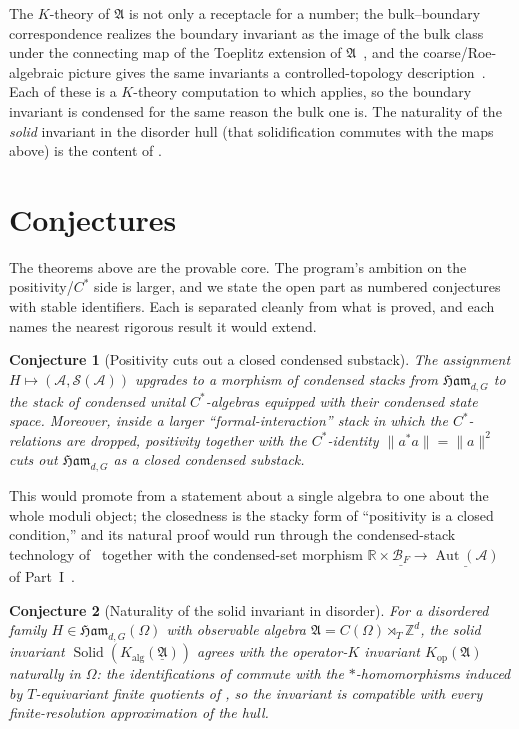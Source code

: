 \documentclass[12pt]{article}
\newcommand{\cond}[1]{\underline{#1}}          %
\newcommand{\BF}{\mathcal{B}_{F}}              %
\newcommand{\Ham}{\mathfrak{Ham}}              %
\newcommand{\Kop}{K_{\mathrm{op}}}             %
\newcommand{\Kalg}{K_{\mathrm{alg}}}           %
\newcommand{\Solid}{\operatorname{Solid}}      %
\newcommand{\dis}{\Omega}                       %
\newcommand{\qla}{\mathcal{A}}                  %
\newcommand{\St}{\mathcal{S}}                   %
\newcommand{\Aut}{\operatorname{Aut}}          %
\newcommand{\dalg}{\mathfrak{A}}               %
\newcommand{\RR}{\mathbb{R}}
\newcommand{\ZZ}{\mathbb{Z}}
\newcommand{\norm}[1]{\lVert #1 \rVert}
\theoremstyle{plain}
\newtheorem{conjecture}{Conjecture}
\begin{document}
\begin{remark}
The $K$-theory of $\dalg$ is not only a receptacle for a number; the bulk--boundary
correspondence realizes the boundary invariant as the image of the bulk class under
the connecting map of the Toeplitz extension of
$\dalg$~\cite{bourne-kellendonk-rennie}, and the coarse/Roe-algebraic picture gives
the same invariants a controlled-topology
description~\cite{kubota-controlled}. Each of these is a $K$-theory computation to
which  applies, so the boundary invariant is condensed for
the same reason the bulk one is. The naturality of the \emph{solid} invariant in the
disorder hull (that solidification commutes with the maps above) is the content
of .
\end{remark}

\section{Conjectures}
\label{sec:conjectures}

The theorems above are the provable core. The program's ambition on the
positivity/$C^{*}$ side is larger, and we state the open part as numbered
conjectures with stable identifiers. Each is separated cleanly from what is proved,
and each names the nearest rigorous result it would extend.

\begin{conjecture}[Positivity cuts out a closed condensed substack]
\label{conj:substack}
The assignment $H\mapsto(\qla,\St(\qla))$ upgrades to a morphism of condensed stacks
from $\Ham_{d,G}$ to the stack of condensed unital $C^{*}$-algebras equipped with
their condensed state space. Moreover, inside a larger ``formal-interaction'' stack
in which the $C^{*}$-relations are dropped, positivity together with the
$C^{*}$-identity $\norm{a^{*}a}=\norm{a}^{2}$ cuts out $\Ham_{d,G}$ as a
\emph{closed} condensed substack.
\end{conjecture}

\noindent This would promote  from a statement about a single
algebra to one about the whole moduli object; the closedness is the stacky form of
``positivity is a closed condition,'' and its natural proof would run through the
condensed-stack technology of~\cite{clausen-scholze-analytic-stacks} together with
the condensed-set morphism $\RR\times\cond{\BF}\to\cond{\Aut(\qla)}$ of
Part~I~\cite{paperLocality}.

\begin{conjecture}[Naturality of the solid invariant in disorder]
\label{conj:solidnat}
For a disordered family $H\in\Ham_{d,G}(\dis)$ with observable algebra
$\dalg=C(\dis)\rtimes_{T}\ZZ^{d}$, the solid invariant
$\Solid(\Kalg(\cond{\dalg}))$ agrees with the operator-$K$ invariant $\Kop(\dalg)$
\emph{naturally in $\dis$}: the identifications of  commute with the
$\ast$-homomorphisms induced by $T$-equivariant finite quotients of ,
so the invariant is compatible with every finite-resolution approximation of the
hull.
\end{conjecture}
\end{document}
